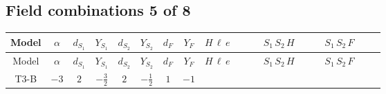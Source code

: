 \documentclass[8pt]{article}
\begin{document}
\begin{landscape}
\subsection*{Field combinations 5 of 8}
\begin{longtable}{@{}cccccccc >{\raggedright\arraybackslash}p{0.21\linewidth} >{\raggedright\arraybackslash}p{0.21\linewidth} >{\raggedright\arraybackslash}p{0.21\linewidth}@{}}
\toprule
Model & $\alpha$ & $d_{S_1}$ & $Y_{S_1}$ & $d_{S_2}$ & $Y_{S_2}$ & $d_F$ & $Y_F$ & $H\,\ell\,e$ & $S_1\,S_2\,H$ & $S_1\,S_2\,F$ \\
\midrule
\endfirsthead
\toprule
Model & $\alpha$ & $d_{S_1}$ & $Y_{S_1}$ & $d_{S_2}$ & $Y_{S_2}$ & $d_F$ & $Y_F$ & $H\,\ell\,e$ & $S_1\,S_2\,H$ & $S_1\,S_2\,F$ \\
\midrule
\endhead
T3-B & $-3$ & $2$ & $-\frac{3}{2}$ & $2$ & $-\frac{1}{2}$ & $1$ & $-1$ & \scriptsize\adjustbox{max width=\linewidth}{$\begin{gathered} +\frac{\hbar  \overline{y_{1,i_3,r_1}} \overline{L_{a_1,i_2}}\, P_R\, e_{i_1} H_{a_1} y_{1,i_2,r_1} Y_{e,i_3,i_1}}{4 \epsilon } \\ +\frac{3}{8} \hbar  \overline{y_{1,i_3,r_1}} \overline{L_{a_1,i_2}}\, P_R\, e_{i_1} H_{a_1} y_{1,i_2,r_1} Y_{e,i_3,i_1} \\ +\frac{\hbar  \overline{y_{2,i_3,r_1}} \overline{L_{a_1,i_2}}\, P_R\, e_{i_1} H_{a_1} y_{2,i_2,r_1} Y_{e,i_3,i_1}}{4 \epsilon }\end{gathered}$} & \scriptsize\adjustbox{max width=\linewidth}{$\begin{gathered} +\overline{\lambda_5} S_{2,j_2} {\mathcal{I}_{LLS_1S_2}}^{*}_{a_1,a_2,j_1,j_2} H_{a_1}{}^{\dagger } H_{a_2}{}^{\dagger } S_{1,j_1}{}^{\dagger } \\ -\frac{\hbar  \overline{y_{1,i_1,r_1}} \overline{\lambda_5} S_{2,j_2} y_{1,i_1,r_1} {\mathcal{I}_{LLS_1S_2}}^{*}_{a_1,a_2,j_1,j_2} H_{a_1}{}^{\dagger } H_{a_2}{}^{\dagger } S_{1,j_1}{}^{\dagger }}{2 \epsilon } \\ -\frac{1}{4} \hbar  \overline{y_{1,i_1,r_1}} \overline{\lambda_5} S_{2,j_2} y_{1,i_1,r_1} {\mathcal{I}_{LLS_1S_2}}^{*}_{a_1,a_2,j_1,j_2} H_{a_1}{}^{\dagger } H_{a_2}{}^{\dagger } S_{1,j_1}{}^{\dagger }\end{gathered}$} & \scriptsize\adjustbox{max width=\linewidth}{$\begin{gathered} +2 \hbar  \log \left(\frac{\bar{\mu}^{2}}{M_F^2}\right) \overline{y_{1,i_1,r_1}} \overline{y_{2,i_2,r_2}} S_{1,j_2} S_{2,j_1} y_{1,i_2,r_1} y_{2,i_1,r_2} S_{1,j_1}{}^{\dagger } S_{2,j_2}{}^{\dagger } \\ -2 \hbar  \log \left(\frac{\bar{\mu}^{2}}{M_F^2}\right) \overline{y_{1,i_1,r_1}} \overline{y_{2,i_2,r_2}} S_{1,j_1} S_{2,j_2} y_{1,i_2,r_1} y_{2,i_1,r_2} S_{1,j_1}{}^{\dagger } S_{2,j_2}{}^{\dagger } \\ -\hbar  \log \left(\frac{\bar{\mu}^{2}}{M_F^2}\right) \overline{y_{1,i_1,r_1}} S_{1,j_4} S_{2,j_3} y_{1,i_1,r_1} S_{1,j_1}{}^{\dagger } S_{2,j_2}{}^{\dagger } \mathcal{I}_{12,j_2,j_3,j_1,j_4}{}^1 \lambda_{12}^{(1)}^{(1)}\end{gathered}$} \\

\end{longtable}
\end{landscape}
\end{document}
